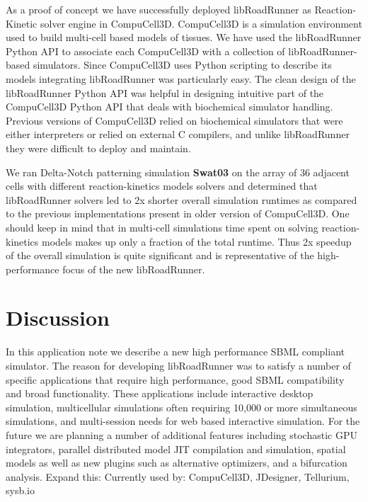 \documentclass{bioinfo}
\begin{document}
As a proof of concept we have successfully deployed libRoadRunner as Reaction-Kinetic solver engine in CompuCell3D. CompuCell3D is a simulation environment used to build multi-cell based models of tissues. We have used the libRoadRunner Python API to associate each CompuCell3D with a collection of libRoadRunner-based simulators. Since CompuCell3D uses Python scripting to describe its models integrating libRoadRunner was particularly easy. The clean design of the libRoadRunner Python API was helpful in designing intuitive part of the CompuCell3D Python API that deals with biochemical simulator handling. Previous versions of CompuCell3D relied on biochemical simulators that were either interpreters or relied on external C compilers, and unlike libRoadRunner they were difficult to deploy and maintain. 

We ran Delta-Notch patterning simulation {\bf Swat03} on the array of 36 adjacent cells with different reaction-kinetics models solvers and determined that libRoadRunner solvers led to  2x shorter overall simulation runtimes as compared to the previous implementations present in older version of CompuCell3D. One should keep in mind that in multi-cell simulations time spent on solving reaction-kinetics models makes up only a fraction of the total runtime. Thus 2x  speedup of the overall simulation is quite significant and is representative of the high-performance focus of the new libRoadRunner. 
  


\section{Discussion}

In this application note we describe a new high performance SBML compliant simulator. The reason for developing libRoadRunner was to satisfy a number of specific applications that require high performance, good SBML compatibility and broad functionality. These applications include interactive desktop simulation, multicellular simulations often requiring 10,000 or more simultaneous simulations, and multi-session needs for web based interactive simulation.  For the future we are planning a number of additional features including stochastic GPU integrators, parallel distributed model JIT compilation and simulation, spatial models as well as new plugins such as alternative optimizers, and a bifurcation analysis. Expand this: Currently used by: CompuCell3D, JDesigner, Tellurium, sysb.io
\end{document}
